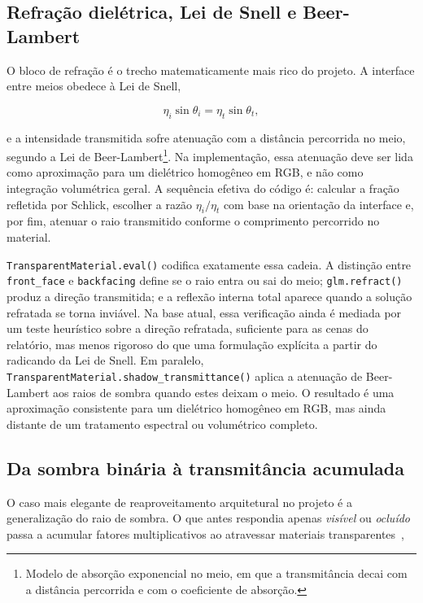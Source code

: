 \documentclass[portuguese]{sbcreviews-2025}%
\makeatletter
\newcommand{\slideurl}[1]{%
    \ifcsname slideurl@#1\endcsname
        \csname slideurl@#1\endcsname
    \else
        #1
    \fi
}
\newcommand{\slidescite}[2]{\citep[\href{\slideurl{#1}}{pp.~#2}]{#1}}
\makeatother
\begin{document}
\subsection{Refração dielétrica, Lei de Snell e Beer-Lambert}
\label{sec:refracao-v3}

O bloco de refração é o trecho matematicamente mais rico do projeto. A interface entre meios obedece à Lei de Snell,

\[
\eta_i\sin\theta_i = \eta_t\sin\theta_t,
\]

e a intensidade transmitida sofre atenuação com a distância percorrida no meio, segundo a Lei de Beer-Lambert\footnote{Modelo de absorção exponencial no meio, em que a transmitância decai com a distância percorrida e com o coeficiente de absorção.}. Na implementação, essa atenuação deve ser lida como aproximação para um dielétrico homogêneo em RGB, e não como integração volumétrica geral. A sequência efetiva do código é: calcular a fração refletida por Schlick, escolher a razão \(\eta_i/\eta_t\) com base na orientação da interface e, por fim, atenuar o raio transmitido conforme o comprimento percorrido no material.

\texttt{TransparentMaterial.eval()} codifica exatamente essa cadeia. A distinção entre \texttt{front\_face} e \texttt{backfacing} define se o raio entra ou sai do meio; \texttt{glm.refract()} produz a direção transmitida; e a reflexão interna total aparece quando a solução refratada se torna inviável. Na base atual, essa verificação ainda é mediada por um teste heurístico sobre a direção refratada, suficiente para as cenas do relatório, mas menos rigoroso do que uma formulação explícita a partir do radicando da Lei de Snell. Em paralelo, \texttt{TransparentMaterial.shadow\_transmittance()} aplica a atenuação de Beer-Lambert aos raios de sombra quando estes deixam o meio. O resultado é uma aproximação consistente para um dielétrico homogêneo em RGB, mas ainda distante de um tratamento espectral ou volumétrico completo.

\subsection{Da sombra binária à transmitância acumulada}
\label{sec:transmitancia-v3}

O caso mais elegante de reaproveitamento arquitetural no projeto é a generalização do raio de sombra. O que antes respondia apenas \emph{visível} ou \emph{ocluído} passa a acumular fatores multiplicativos ao atravessar materiais transparentes~\slidescite{inf2608slides05}{33--35},
\end{document}

